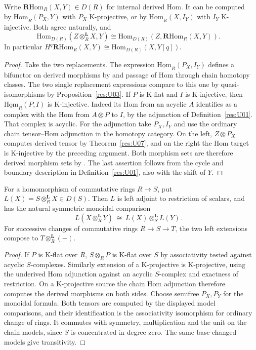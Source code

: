 \begin{theorem}\label{res:U08}
Write \(\mathbf R\mathrm{Hom}_R(X,Y)\in D(R)\) for internal
derived Hom. It can be computed by
\(\underline{\mathrm{Hom}}_R(P_X,Y)\) with \(P_X\) K-projective,
or by \(\underline{\mathrm{Hom}}_R(X,I_Y)\) with \(I_Y\)
K-injective. Both agree naturally, and
\[
 \mathrm{Hom}_{D(R)}(Z\otimes_R^{\mathbf L}X,Y)
  \cong \mathrm{Hom}_{D(R)}(Z,\mathbf R\mathrm{Hom}_R(X,Y)).
\]
In particular
\(
 H^q\mathbf R\mathrm{Hom}_R(X,Y)
   \cong\mathrm{Hom}_{D(R)}(X,Y[q]).
\)
\end{theorem}
\begin{proof}
Take the two replacements. The expression
\(\underline{\mathrm{Hom}}_R(P_X,I_Y)\) defines a bifunctor
on derived morphisms by \cite[R04]{ha-core} and passage of Hom
through chain homotopy classes. The two single replacement
expressions compare to this one by quasi-isomorphisms by
Proposition~\ref{res:U03}. If \(P\) is K-flat and \(I\) is
K-injective, then \(\underline{\mathrm{Hom}}_R(P,I)\) is
K-injective. Indeed its Hom from an acyclic \(A\) identifies
as a complex with the Hom from \(A\otimes P\) to \(I\), by the
adjunction of Definition~\ref{res:U01}. That complex is acyclic.
For the adjunction take \(P_X,I_Y\) and use the ordinary
chain tensor--Hom adjunction in the homotopy category.
On the left, \(Z\otimes P_X\) computes derived tensor by
Theorem~\ref{res:U07}, and on the right the Hom target is
K-injective by the preceding argument. Both morphism sets
are therefore derived morphism sets by \cite[R04]{ha-core}.
The last assertion follows from the cycle and boundary description
in Definition~\ref{res:U01}, also with the shift of \(Y\).
\end{proof}

\begin{proposition}\label{res:U09}
For a homomorphism of commutative rings \(R\to S\), put
\(L(X)=S\otimes_R^{\mathbf L}X\in D(S)\).
Then \(L\) is left adjoint to restriction of scalars, and has the
natural symmetric monoidal comparison
\[
 L(X\otimes_R^{\mathbf L}Y)\ \cong\
 L(X)\otimes_S^{\mathbf L} L(Y).
\]
For successive changes of commutative rings \(R\to S\to T\), the two left extensions
compose to \(T\otimes_R^{\mathbf L}(-)\).
\end{proposition}
\begin{proof}
If \(P\) is K-flat over \(R\), \(S\otimes_R P\) is K-flat over \(S\)
by associativity tested against acyclic \(S\)-complexes.
Similarly extension of a K-projective is K-projective, using the
underived Hom adjunction against an acyclic \(S\)-complex and
exactness of restriction. On a K-projective source the chain Hom
adjunction therefore computes the derived morphisms on both sides.
Choose semifree \(P_X,P_Y\) for the monoidal formula. Both tensors
are computed by the displayed model comparisons, and their
identification is the associativity isomorphism for ordinary
change of rings. It commutes with symmetry, multiplication and the
unit on the chain models, since \(S\) is concentrated in degree zero.
The same base-changed models give transitivity.
\end{proof}
